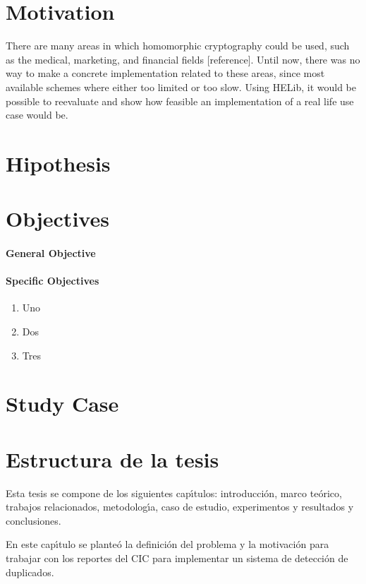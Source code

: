 \section{Motivation}

There are many areas in which homomorphic cryptography could be used, such as the medical, marketing, and financial fields [reference]. Until now, there was no way to make a concrete implementation related to these areas, since most available schemes where either too limited or too slow.  Using HELib, it would be possible to reevaluate and show how feasible an implementation of a real life use case would be. 


\section{Hipothesis}

\section{Objectives}

\paragraph{General Objective}

\paragraph{Specific Objectives}
\begin{enumerate}
\item Uno
\item Dos 
\item Tres
\end{enumerate}

\section{Study Case}




\section{Estructura de la tesis}
Esta tesis se compone de los siguientes cap\'{\i}tulos: introducci\'{o}n, marco te\'{o}rico, trabajos relacionados, metodolog\'{\i}a, caso de estudio, experimentos y resultados y conclusiones.

En este cap\'{\i}tulo se plante\'{o} la definici\'{o}n del problema y la motivaci\'{o}n para trabajar con los reportes del CIC para implementar un sistema de detecci\'{o}n de duplicados.

